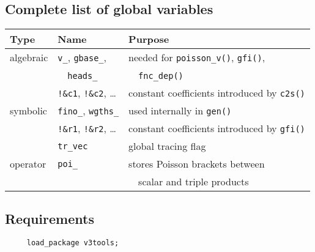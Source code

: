 \subsection{Complete list of global variables}

\begin{center}
\begin{tabular}{l|l|l}
  Type      & Name & Purpose \\ \hline
  algebraic & \texttt{v\_}, \texttt{gbase\_},
                   & needed for \texttt{poisson\_v()}, \texttt{gfi()}, \\
            & ~~\texttt{heads\_}
                   & ~~\texttt{fnc\_dep()} \\
            & \texttt{!\&c1}, \texttt{!\&c2}, \ldots
                   & constant coefficients introduced by \texttt{c2s()} \\ \hline
  symbolic  &  \texttt{fino\_}, \texttt{wgths\_}
                   & used internally in \texttt{gen()} \\
            &  \texttt{!\&r1}, \texttt{!\&r2}, \ldots
                   & constant coefficients introduced by \texttt{gfi()} \\
            &  \texttt{tr\_vec}
                   & global tracing flag \\ \hline
  operator  &  \texttt{poi\_}
                   & stores Poisson brackets between \\
           &       & ~~scalar and triple products
\end{tabular}
\end{center}

\subsection{Requirements}

\begin{verbatim}
     load_package v3tools;
\end{verbatim}
